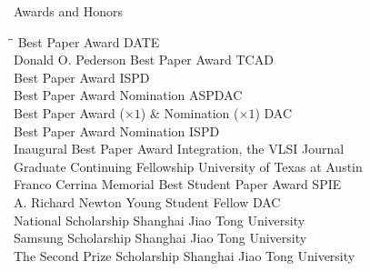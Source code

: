 
\begin{rSection}{Awards and Honors}
\begin{tabbing}
\hspace{3.3in}\= \hspace{3.1in}\= \kill
Best Paper Award \> DATE  \\
Donald O. Pederson Best Paper Award \> TCAD  \\
Best Paper Award \> ISPD  \\
Best Paper Award Nomination \> ASPDAC  \\
Best Paper Award ($\times 1$) \& Nomination ($\times 1$) \> DAC  \\
Best Paper Award Nomination \> ISPD  \\
Inaugural Best Paper Award \> Integration, the VLSI Journal  \\
Graduate Continuing Fellowship \> University of Texas at Austin  \\
Franco Cerrina Memorial Best Student Paper Award \> SPIE  \\
A. Richard Newton Young Student Fellow \> DAC  \\
    National Scholarship \> Shanghai Jiao Tong University  \\
    Samsung Scholarship \> Shanghai Jiao Tong University  \\
    The Second Prize Scholarship \> Shanghai Jiao Tong University 
\end{tabbing}
\end{rSection}

